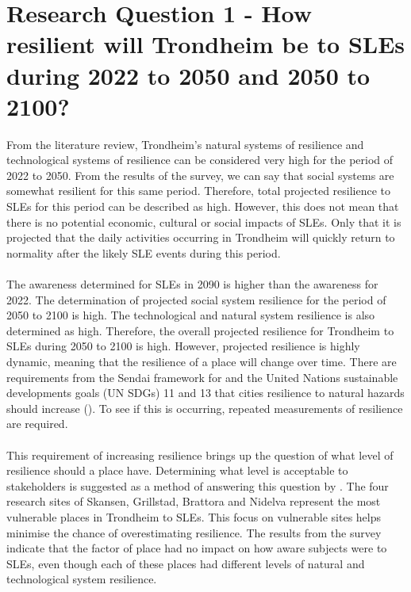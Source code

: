 \section{Research Question 1 - How resilient will Trondheim be to SLEs during 2022 to 2050 and 2050 to 2100? }
From the literature review, Trondheim's natural systems of resilience and technological systems of resilience can be considered very high for the period of 2022 to 2050. From the results of the survey,  we can say that social systems are somewhat resilient for this same period. Therefore, total projected resilience to SLEs for this period can be described as high. However, this does not mean that there is no potential economic, cultural or social impacts of SLEs. Only that it is projected that the daily activities occurring in Trondheim will quickly return to normality after the likely SLE events during this period.
\paragraph{}
The awareness determined for SLEs in 2090 is higher than the awareness for 2022. The determination of projected social system resilience for the period of 2050 to 2100 is high. The technological and natural system resilience is also determined as high. Therefore, the overall projected resilience for Trondheim to SLEs during 2050 to 2100 is high. However, projected resilience is highly dynamic, meaning that the resilience of a place will change over time. There are requirements from the Sendai framework for and the United Nations sustainable developments goals (UN SDGs) 11 and 13 that cities resilience to natural hazards should increase (\cite{gonzalez-riancho_storm_2017}). To see if this is occurring, repeated measurements of resilience are required. 

\paragraph{}
This requirement of increasing resilience brings up the question of what level of resilience should a place have. Determining what level is acceptable to stakeholders is suggested as a method of answering this question by \cite{gerkensmeier_governing_2018}. The four research sites of Skansen, Grillstad, Brattora and Nidelva represent the most vulnerable places in Trondheim to SLEs. This focus on vulnerable sites helps minimise the chance of overestimating resilience. The results from the survey indicate that the factor of place had no impact on how aware subjects were to SLEs, even though each of these places had different levels of natural and technological system resilience. 
